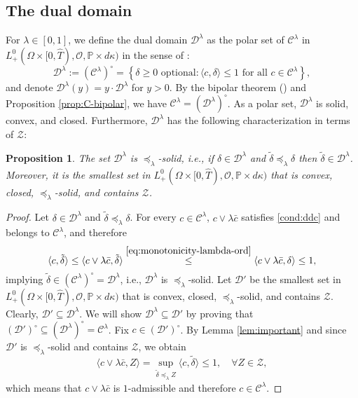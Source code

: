 \documentclass[11pt, oneside]{article}   	%
\theoremstyle{plain}
\newtheorem{prop}[thm]{Proposition}
\theoremstyle{definition}
\theoremstyle{remark}
\begin{document}


\subsection{The dual domain}

For $\lambda\in[0,1]$, we define the dual domain $\mathcal{D}^\lambda$ as the polar set of $\mathcal{C}^\lambda$ in $L_+^0(\Omega\times[0,\hat{T}),\mathcal{O},\mathbb{P}\times d\kappa)$ in the sense of \cite{bipolar}: $$\mathcal{D}^\lambda:=(\mathcal{C}^\lambda)^\circ=\left\{\delta\geq 0\text{ optional}: \langle c,\delta \rangle\leq 1\text{ for all }c\in\mathcal{C}^\lambda\right\},$$ 
and denote $\mathcal{D}^\lambda(y)=y\cdot\mathcal{D}^\lambda$ for $y>0$. By the bipolar theorem (\cite{bipolar}) and Proposition \ref{prop:C-bipolar}, we have $\mathcal{C}^\lambda=(\mathcal{D}^\lambda)^\circ$. As a polar set, $\mathcal{D}^\lambda$ is solid, convex, and closed. Furthermore, $\mathcal{D}^\lambda$ has the following characterization in terms of $\mathcal{Z}$:
\begin{prop}\label{prop:min-of-D}
The set $\mathcal{D}^\lambda$ is $\preceq_\lambda$-solid, i.e., if $\delta\in\mathcal{D}^\lambda$ and $\tilde{\delta}\preceq_\lambda\delta$ then $\tilde\delta\in\mathcal{D}^\lambda$. Moreover, it is the smallest set in $L_+^0(\Omega\times[0,\hat{T}),\mathcal{O},\mathbb{P}\times d\kappa)$ that is convex, closed, $\preceq_\lambda$-solid, and contains $\mathcal{Z}$.
\end{prop}
\begin{proof}
Let $\delta\in\mathcal{D}^\lambda$ and $\tilde{\delta}\preceq_\lambda\delta$. For every $c\in\mathcal{C}^\lambda$, $c\vee\lambda\bar{c}$ satisfies \eqref{cond:ddc} and belongs to $\mathcal{C}^\lambda$, and therefore
$$\langle c,\tilde{\delta} \rangle\leq\langle c\vee\lambda\bar{c},\tilde{\delta} \rangle\overset{\eqref{eq:monotonicity-lambda-ord}}{\leq}\langle c\vee\lambda\bar{c},\delta \rangle\leq 1,$$
implying $\tilde\delta\in(\mathcal{C}^\lambda)^\circ=\mathcal{D}^\lambda$, i.e., $\mathcal{D}^\lambda$ is $\preceq_\lambda$-solid. Let $\mathcal{D}'$ be the smallest set in $L_+^0(\Omega\times[0,\hat{T}),\mathcal{O},\mathbb{P}\times d\kappa)$ that is convex, closed, $\preceq_\lambda$-solid, and contains $\mathcal{Z}$. Clearly, $\mathcal{D}'\subseteq\mathcal{D}^\lambda$. We will show $\mathcal{D}^\lambda\subseteq\mathcal{D}'$ by proving that $(\mathcal{D}')^\circ\subseteq(\mathcal{D}^\lambda)^\circ=\mathcal{C}^\lambda$. Fix $c\in(\mathcal{D}')^\circ$. By Lemma \ref{lem:important} and since $\mathcal{D}'$ is $\preceq_\lambda$-solid and contains $\mathcal{Z}$, we obtain
$$\langle c\vee\lambda\bar{c},Z \rangle=\sup_{\tilde\delta\preceq_\lambda Z}\langle c,\tilde\delta \rangle\leq 1,\quad \forall Z\in\mathcal{Z},$$
which means that $c\vee\lambda\bar{c}$ is $1$-admissible and therefore $c\in\mathcal{C}^\lambda$.
\end{proof}
\end{document}
